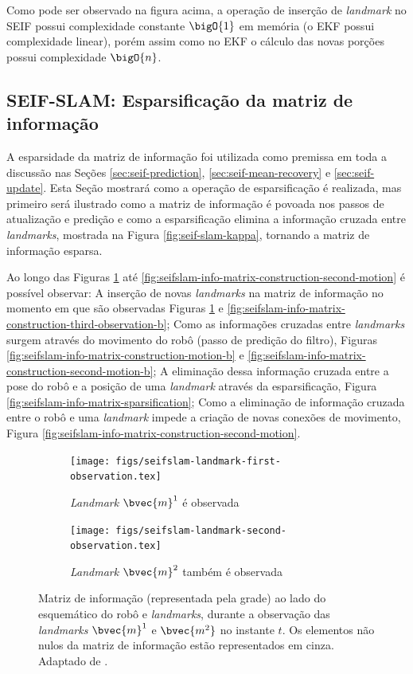 Como pode ser observado na figura acima, a operação de inserção de \textit{landmark} no SEIF possui complexidade constante $\bigO{1}$ em memória (o EKF possui complexidade linear), porém assim como no EKF o cálculo das 
novas porções possui complexidade $\bigO{n}$.

\subsection{SEIF-SLAM: Esparsificação da matriz de informação}
A esparsidade da matriz de informação foi utilizada como premissa em 
toda a discussão nas Seções \ref{sec:seif-prediction}, \ref{sec:seif-mean-recovery} e \ref{sec:seif-update}. Esta Seção mostrará como a operação de esparsificação é realizada, mas primeiro será 
ilustrado como a matriz de informação é povoada nos passos de 
atualização e predição e como a esparsificação elimina a informação 
cruzada entre \textit{landmarks}, mostrada na Figura \ref{fig:seif-slam-kappa}, tornando a matriz de informação esparsa.

Ao longo das Figuras \ref{fig:seifslam-info-matrix-construction-observation} até \ref{fig:seifslam-info-matrix-construction-second-motion} é possível 
observar: A inserção de novas \textit{landmarks} na matriz de informação no momento em que são observadas Figuras \ref{fig:seifslam-info-matrix-construction-observation} e \ref{fig:seifslam-info-matrix-construction-third-observation-b}; Como as 
informações cruzadas entre \textit{landmarks} surgem através do 
movimento do robô (passo de predição do filtro), Figuras \ref{fig:seifslam-info-matrix-construction-motion-b} e \ref{fig:seifslam-info-matrix-construction-second-motion-b}; A 
eliminação dessa informação cruzada entre a pose do robô e a posição de uma \textit{landmark} através da esparsificação, Figura \ref{fig:seifslam-info-matrix-sparsification}; Como a eliminação de 
informação cruzada entre o robô e uma \textit{landmark} impede a criação de novas conexões de movimento, Figura \ref{fig:seifslam-info-matrix-construction-second-motion}.

\begin{figure}[h]
  \begin{subfigure}{0.475\textwidth}
    \texttt{[image: figs/seifslam-landmark-first-observation.tex]} 
    \caption{\textit{Landmark} $\bvec{m}^1$ é observada}
  \end{subfigure}
  \hfill
  \begin{subfigure}{0.475\textwidth}
    \texttt{[image: figs/seifslam-landmark-second-observation.tex]}
    \caption{\textit{Landmark} $\bvec{m}^2$ também é observada}
  \end{subfigure}
  \caption{Matriz de informação (representada pela grade) ao lado do esquemático do robô e \textit{landmarks}, durante a observação das 
  \textit{landmarks} $\bvec{m}^1$ e $\bvec{m^2}$ no instante $t$. Os elementos não nulos da matriz de informação estão representados em cinza. Adaptado de \cite[p.~389]{bongard2006probabilistic}.}
  \label{fig:seifslam-info-matrix-construction-observation}
\end{figure}

